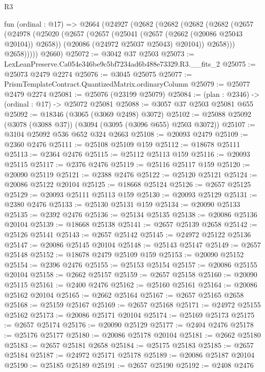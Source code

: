 \begin{lexlean}{R3}
\begin{coremodule}
  fun (ordinal : @17) =>
  @2664
    (@24927
      (@2682
        (@2682
          (@2682
            (@2682
              (@2657
                (@24978
                  (@25020
                    (@2657
                      (@2657
                        (@25041 (@2657 (@2662 (@20086 @25043 @20104)) @2658))
                        (@20086 (@24972 @25037 @25043) @20104))
                      @2658)))
                @2658)))))
      @2660)
@25072 := @3042 @37 @2503
@25073 := LexLeanPreserve.Ca054e346be9c5bf7234ad6b488e73329.R3.__fits_2
@25075 := @25073 @2479 @2274
@25076 := @3045 @25075
@25077 := PrismTemplateContract.QuantizedMatrix.ordinaryColumn
@25079 := @25077 @2479 @2274
@25081 := @25076 (@23199 @25079)
@25084 := (plan : @2346) -> (ordinal : @17) -> @25072 @25081
@25088 := @3057 @37 @2503 @25081 @655
@25092 := @18346 (@3065 (@3069 @2498) @3072)
@25102 := @25088 @25092 (@3078 (@3088 @37)) (@3094 (@3095 (@3096 @655) @2503 @3072))
@25107 := @3104 @25092 @536 @652 @324 @2663
@25108 := @20093 @2479
@25109 := @2360 @2476
@25111 := @25108 @25109 @159
@25112 := @18678 @25111
@25113 := @2364 @2476
@25115 := @25112 @25113 @159
@25116 := @20093 @25115
@25117 := @2376 @2476
@25119 := @25116 @25117 @159
@25120 := @20090 @25119
@25121 := @2388 @2476
@25122 := @25120 @25121
@25124 := @20086 @25122 @20104
@25125 := @18668 @25124
@25126 := @2657 @25125
@25129 := @20093 @25111 @25113 @159
@25130 := @20093 @25129
@25131 := @2380 @2476
@25133 := @25130 @25131 @159
@25134 := @20090 @25133
@25135 := @2392 @2476
@25136 := @25134 @25135
@25138 := @20086 @25136 @20104
@25139 := @18668 @25138
@25141 := @2657 @25139 @2658
@25142 := @25126 @25141
@25143 := @2657 @25142
@25145 := @24972 @25122 @25136
@25147 := @20086 @25145 @20104
@25148 := @25143 @25147
@25149 := @2657 @25148
@25152 := @18678 @2479 @25109 @159
@25153 := @20090 @25152
@25154 := @2396 @2476
@25155 := @25153 @25154
@25157 := @20086 @25155 @20104
@25158 := @2662 @25157
@25159 := @2657 @25158
@25160 := @20090 @25115
@25161 := @2400 @2476
@25162 := @25160 @25161
@25164 := @20086 @25162 @20104
@25165 := @2662 @25164
@25167 := @2657 @25165 @2658
@25168 := @25159 @25167
@25169 := @2657 @25168
@25171 := @24972 @25155 @25162
@25173 := @20086 @25171 @20104
@25174 := @25169 @25173
@25175 := @2657 @25174
@25176 := @20090 @25129
@25177 := @2404 @2476
@25178 := @25176 @25177
@25180 := @20086 @25178 @20104
@25181 := @2662 @25180
@25183 := @2657 @25181 @2658
@25184 := @25175 @25183
@25185 := @2657 @25184
@25187 := @24972 @25171 @25178
@25189 := @20086 @25187 @20104
@25190 := @25185 @25189
@25191 := @2657 @25190
@25192 := @2408 @2476

\end{coremodule}
\end{lexlean}
